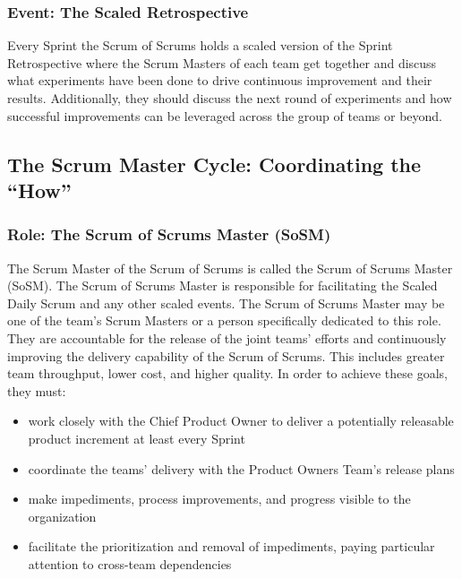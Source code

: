 \documentclass[12pt,a4paper,parskip=full]{scrartcl}
\begin{document}
\subsubsection{Event: The Scaled
Retrospective}\label{event-the-scaled-retrospective}

Every Sprint the Scrum of Scrums holds a scaled version of the Sprint
Retrospective where the Scrum Masters of each team get together and
discuss what experiments have been done to drive continuous improvement
and their results. Additionally, they should discuss the next round of
experiments and how successful improvements can be leveraged across the
group of teams or beyond.

\subsection{The Scrum Master Cycle: Coordinating the
``How''}\label{the-scrum-master-cycle}

\subsubsection{Role: The Scrum of Scrums Master
(SoSM)}\label{role-the-scrum-of-scrums-master}

The Scrum Master of the Scrum of Scrums is called the Scrum of Scrums
Master (SoSM). The Scrum of Scrums Master is responsible for
facilitating the Scaled Daily Scrum and any other scaled events. The
Scrum of Scrums Master may be one of the team's Scrum Masters or a
person specifically dedicated to this role. They are accountable for the
release of the joint teams' efforts and continuously improving the
delivery capability of the Scrum of Scrums. This includes greater team
throughput, lower cost, and higher quality. In order to achieve these
goals, they must:

\begin{itemize}
\itemsep1pt\parskip0pt
\item
  work closely with the Chief Product Owner to deliver a potentially
  releasable product increment at least every Sprint
\item
  coordinate the teams' delivery with the Product Owners Team's release
  plans
\item
  make impediments, process improvements, and progress visible to the
  organization
\item
  facilitate the prioritization and removal of impediments, paying
  particular attention to cross-team dependencies
\end{itemize}
\end{document}
